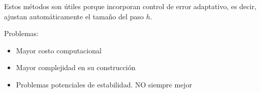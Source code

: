\documentclass[12pt,a4paper]{article}
\begin{document}
Estos métodos son útiles porque incorporan control de error adaptativo, es decir, ajustan automáticamente el tamaño del paso $h$. 

Problemas:\begin{itemize}
\item Mayor costo computacional
\item Mayor complejidad en su construcción
\item Problemas potenciales de estabilidad. NO siempre mejor
\end{itemize}
\end{document}
